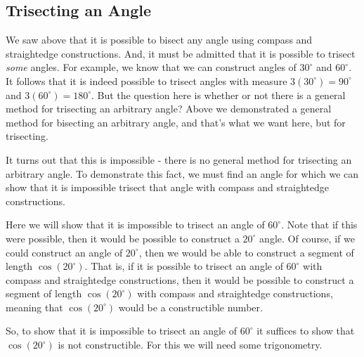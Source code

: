\documentclass[11pt]{article}
\theoremstyle{definition}
\begin{document}
\subsection{Trisecting an Angle}

We saw above that it is possible to bisect any angle using compass and straightedge constructions. And, it must be admitted that it is possible to
trisect \textit{some} angles. For example, we know that we can construct angles of $30^\circ$ and $60^\circ$. It follows that it is indeed possible
to trisect angles with measure $3(30^\circ) = 90^\circ$ and $3(60^\circ) = 180^\circ$. But the question here is whether or not there is a general
method for trisecting an arbitrary angle? Above we demonstrated a general method for bisecting an arbitrary angle, and that's what we want here, but
for trisecting.

It turns out that this is impossible - there is no general method for trisecting an arbitrary angle. To demonstrate this fact, we must find an angle for which
we can show that it is impossible trisect that angle with compass and straightedge constructions. 

Here we will show that it is impossible to trisect an angle of $60^\circ$. Note that if this were possible, then it would be possible to construct a 
$20^\circ$ angle. Of course, if we could construct an angle of $20^\circ$, then we would be able to construct a segment of length $\cos(20^\circ)$. That
is, if it is possible to trisect an angle of $60^\circ$ with compass and straightedge constructions, then it would be possible to construct a segment
of length $\cos(20^\circ)$ with compass and straightedge constructions, meaning that $\cos(20^\circ)$ would be a constructible number.

So, to show that it is impossible to trisect an angle of $60^\circ$ it suffices to show that $\cos(20^\circ)$ is not constructible. For this we will need
some trigonometry.
\end{document}
